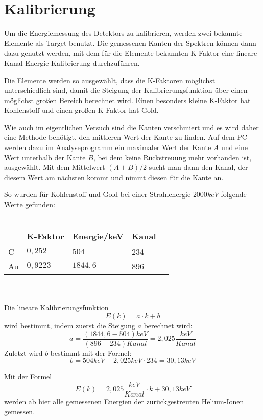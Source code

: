 \section{Kalibrierung}
Um die Energiemessung des Detektors zu kalibrieren, werden zwei bekannte Elemente als Target benutzt. Die gemessenen Kanten der Spektren können dann dazu genutzt werden, mit dem für die Elemente bekannten K-Faktor eine lineare Kanal-Energie-Kalibrierung durchzuführen. 

Die Elemente werden so ausgewählt, dass die K-Faktoren möglichst unterschiedlich sind, damit die Steigung der Kalibrierungsfunktion über einen möglichst großen Bereich berechnet wird. Einen besonders kleine K-Faktor hat Kohlenstoff und einen großen K-Faktor hat Gold.

Wie auch im eigentlichen Versuch sind die Kanten verschmiert und es wird daher eine Methode benötigt, den mittleren Wert der Kante zu finden. Auf dem PC werden dazu im Analyseprogramm ein maximaler Wert der Kante $A$ und eine Wert unterhalb der Kante $B$, bei dem keine Rückstreuung mehr vorhanden ist, ausgewählt. Mit dem Mittelwert $(A+B)/2$ sucht man dann den Kanal, der diesem Wert am nächsten kommt und nimmt diesen für die Kante an.

So wurden für Kohlenstoff und Gold bei einer Strahlenergie $2000keV$ folgende Werte gefunden:\\\\
\begin{tabular}{|l|l|l|l|l|}
\hline
 & K-Faktor & Energie/keV & Kanal\\
 \hline
 C & $0,252$ & $504$ & 234\\
 \hline
 Au & $0,9223$ & $1844,6$ & 896\\
 \hline
\end{tabular}\\\\
Die lineare Kalibrierungsfunktion
\begin{equation}
 E(k)= a\cdot k + b
\end{equation}
wird bestimmt, indem zuerst die Steigung $a$ berechnet wird:
\begin{equation}
 a = \frac{(1844,6 - 504)keV}{(896 - 234)Kanal}=2,025\frac{keV}{Kanal}
\end{equation}
Zuletzt wird $b$ bestimmt mit der Formel:
\begin{equation}
 b = 504keV - 2,025 keV\cdot 234 = 30,13 keV
\end{equation}

Mit der Formel
\begin{equation}
 E(k)=2,025\frac{keV}{Kanal}\cdot k + 30,13keV 
\end{equation}
werden ab hier alle gemessenen Energien der zurückgestreuten Helium-Ionen gemessen.
